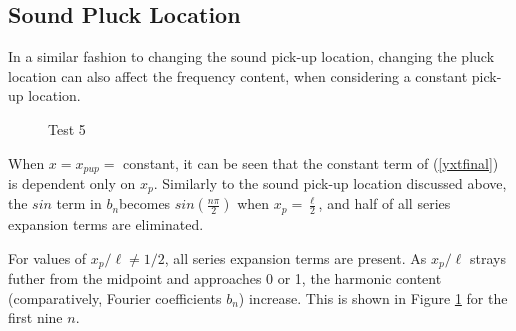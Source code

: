 \documentclass[%
 reprint,
 amsmath,amssymb,
 aps,
]{revtex4-1}
\begin{document}
\subsection{\label{sec:level1}Sound Pluck Location}

In a similar fashion to changing the sound pick-up location, changing the pluck location can also affect the frequency content, when considering a constant pick-up location. \\
\begin{figure}[h]
\caption{Test 5}
\label{Test5}
\end{figure}
When $x = x_{pup}= $ constant, it can be seen that the constant term of (\ref{yxtfinal}) is dependent only on $x_p$. Similarly to the sound pick-up location discussed above, the $sin$ term in $b_n$becomes $sin(\frac{n \pi}{2})$ when  $x_{p} = \frac{\ell}{2}$, and half of all series expansion terms are eliminated.

For values of $x_p/\ell \neq 1/2$, all series expansion terms are present. As $x_p/\ell$ strays futher from the midpoint and approaches 0 or 1, the harmonic content (comparatively, Fourier coefficients $b_n$) increase. This is shown in Figure \ref{Test5} for the first nine $n$.
\end{document}
